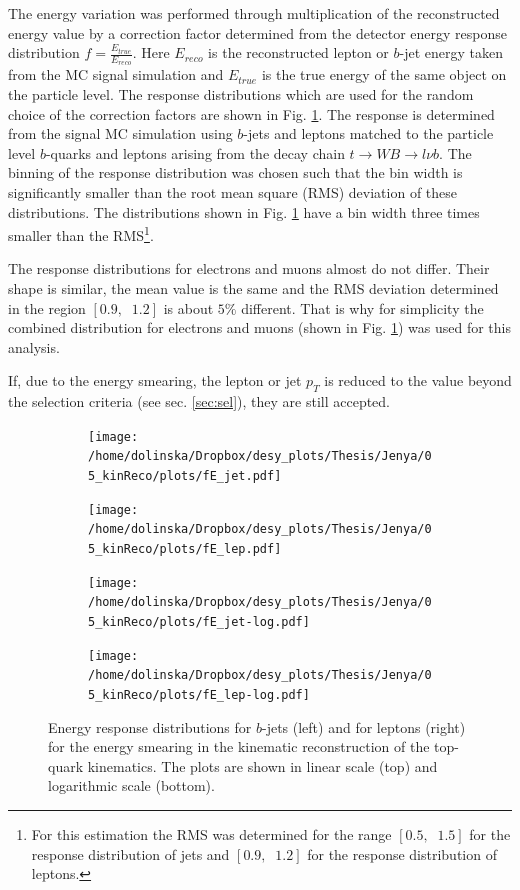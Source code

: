 The energy variation was performed through multiplication of the reconstructed energy value
by a correction factor determined from the detector energy response distribution $f = \frac{E_{true}}{E_{reco}}$. Here $E_{reco}$ is the reconstructed lepton 
or $b$-jet energy taken from the MC signal simulation and $E_{true}$ is the true energy of the same object on the particle level. The response distributions 
which are used for the random choice of the correction factors are shown in Fig. \ref{fig:fE}. The response is determined from 
the signal MC simulation using $b$-jets and leptons matched to the particle level $b$-quarks and leptons arising from the decay chain 
$t \rightarrow WB \rightarrow l\nu b$. The binning of the response distribution was chosen such that the bin width is significantly smaller than the 
root mean square (RMS) deviation of these distributions. The distributions shown in Fig. \ref{fig:fE} have a bin width three times
smaller than the RMS\footnote{For this estimation the RMS was determined for the range $[0.5,\;\;1.5]$ for the response distribution
of jets and $[0.9,\;\;1.2]$ for the response distribution of leptons.}.

The response distributions for electrons and muons almost do not differ. Their shape is similar, the mean value is the same and 
the RMS deviation determined in the region $[0.9,\;\;1.2]$ is about $5\%$ different. That is why for simplicity the combined distribution
for electrons and muons (shown in Fig. \ref{fig:fE}) was used for this analysis. 

If, due to the energy smearing, the lepton or jet $p_{T}$ is reduced to the value beyond the selection criteria (see sec. \ref{sec:sel}), they are still accepted.

\begin{figure}[h]
\centering
\begin{subfigure}
  \centering
  \texttt{[image: /home/dolinska/Dropbox/desy\_plots/Thesis/Jenya/05\_kinReco/plots/fE\_jet.pdf]}
\end{subfigure}
\begin{subfigure}
  \centering
  \texttt{[image: /home/dolinska/Dropbox/desy\_plots/Thesis/Jenya/05\_kinReco/plots/fE\_lep.pdf]}
\end{subfigure}
\begin{subfigure}
  \centering
  \texttt{[image: /home/dolinska/Dropbox/desy\_plots/Thesis/Jenya/05\_kinReco/plots/fE\_jet-log.pdf]}
\end{subfigure}
\begin{subfigure}
  \centering
  \texttt{[image: /home/dolinska/Dropbox/desy\_plots/Thesis/Jenya/05\_kinReco/plots/fE\_lep-log.pdf]}
\end{subfigure}
\caption{Energy response distributions for $b$-jets (left) and for leptons (right) for the energy smearing in the kinematic
reconstruction of the top-quark kinematics. The plots are shown in linear scale (top) and logarithmic scale (bottom).}
\label{fig:fE}
\end{figure}

